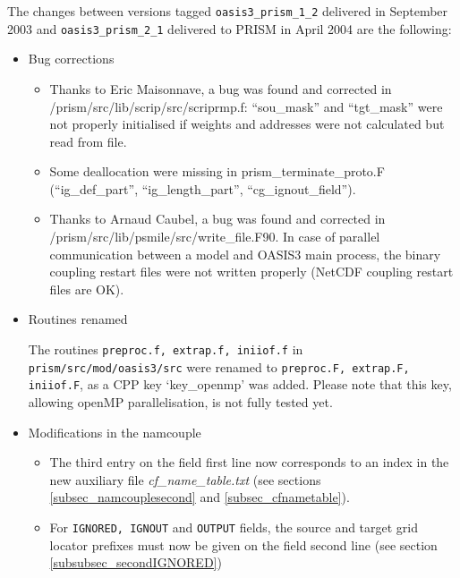 The changes between versions tagged {\tt oasis3\_prism\_1\_2}
delivered in September 2003 and {\tt oasis3\_prism\_2\_1} delivered to
PRISM in April 2004 are the following:

\begin{itemize}

\item Bug corrections

 \begin{itemize}

 \item Thanks to Eric Maisonnave, a bug was found and corrected in
  \- \- \- \- \- \- \- \- 
  /prism/src/lib/scrip/src/scriprmp.f:
  ``sou\_mask'' and ``tgt\_mask'' were not properly initialised if weights
  and addresses were not calculated but read from file.

 \item Some deallocation were missing in prism\_terminate\_proto.F
  (``ig\_def\_part'', ``ig\_length\_part'', ``cg\_ignout\_field'').

 \item Thanks to Arnaud Caubel, a bug was found and corrected in 
  \- \- \- \- \- \- \- \- /prism/src/lib/psmile/src/write\_file.F90. In case of parallel
  communication between a model and OASIS3 main process, the binary
  coupling restart files were not written properly (NetCDF coupling
  restart files are OK).

 \end{itemize} 

\item Routines renamed

The routines {\tt preproc.f, extrap.f, iniiof.f} in {\tt
prism/src/mod/oasis3/src} were renamed to {\tt preproc.F, extrap.F,
iniiof.F}, as a CPP key `key\_openmp' was added. Please note that this
key, allowing openMP parallelisation, is not fully tested yet.

\item Modifications in the namcouple

\begin{itemize}
\item The third entry on the field first line now corresponds to an index in
the new auxiliary file {\em cf\_name\_table.txt} (see sections
\ref{subsec_namcouplesecond} and \ref{subsec_cfnametable}).

\item For {\tt IGNORED, IGNOUT} and {\tt OUTPUT} fields, the source
and target grid locator prefixes must now be given on the field second
line (see section \ref{subsubsec_secondIGNORED})
\end{itemize}


\end{itemize}
